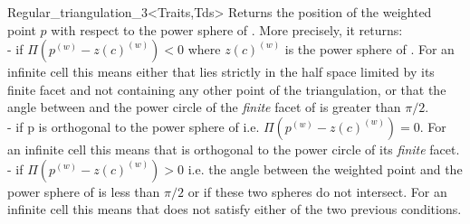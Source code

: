 \begin{ccClassTemplate}{Regular_triangulation_3<Traits,Tds>}
{Returns the position of the weighted point $p$ with respect to the
power sphere of . More precisely, it returns:\\
-  if $\Pi({p}^{(w)}-{z(c)}^{(w)})<0$ where
${z(c)}^{(w)}$ is the power sphere of . For an
infinite cell this means either that  lies strictly in the half
space limited by its finite facet and not containing any other point
of the triangulation, or that the angle 
between  and the power circle of the \textit{finite} facet of 
is greater than $\pi/2$. \\  
-  if p is orthogonal to the power sphere of 
i.e. $\Pi({p}^{(w)}-{z(c)}^{(w)})=0$. For an infinite cell this means
that  is orthogonal to the power circle of its \textit{finite} facet.\\ 
-  if $\Pi({p}^{(w)}-{z(c)}^{(w)})>0$
i.e. the angle between the weighted point  and the power sphere
of  is less than $\pi/2$ or if these two spheres do not
intersect. For an 
infinite cell this means that  does not satisfy either of the
two previous conditions. 
}


\end{ccClassTemplate}
